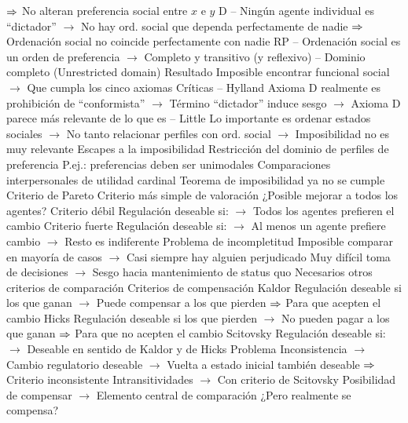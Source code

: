 \documentclass{nuevotema}
\begin{document}
\begin{esquemal}
				\4[] $\Rightarrow$ No alteran preferencia social entre $x$ e $y$
				\4[] D -- Ningún agente individual es ``dictador''
				\4[] $\to$ No hay ord. social que dependa perfectamente de nadie
				\4[] $\Rightarrow$ Ordenación social no coincide perfectamente con nadie
				\4[] RP -- Ordenación social es un orden de preferencia
				\4[] $\to$ Completo y transitivo (y reflexivo)
				\4[U] -- Dominio completo (Unrestricted domain)
				\4 Resultado
				\4[] Imposible encontrar funcional social
				\4[] $\to$ Que cumpla los cinco axiomas
				\4 Críticas
				\4[] -- Hylland
				\4[] Axioma D realmente es prohibición de ``conformista''
				\4[] $\to$ Término ``dictador'' induce sesgo
				\4[] $\to$ Axioma D parece más relevante de lo que es
				\4[] -- Little
				\4[] Lo importante es ordenar estados sociales
				\4[] $\to$ No tanto relacionar perfiles con ord. social
				\4[] $\to$ Imposibilidad no es muy relevante
			\3 Escapes a la imposibilidad
				\4 Restricción del dominio de perfiles de preferencia
				\4[] P.ej.: preferencias deben ser unimodales
				\4 Comparaciones interpersonales de utilidad cardinal
				\4[] Teorema de imposibilidad ya no se cumple
			\3 Criterio de Pareto
				\4 Criterio más simple de valoración
				\4[] ¿Posible mejorar a todos los agentes?
				\4 Criterio débil
				\4[] Regulación deseable si:
				\4[] $\to$ Todos los agentes prefieren el cambio
				\4 Criterio fuerte
				\4[] Regulación deseable si:
				\4[] $\to$ Al menos un agente prefiere cambio
				\4[] $\to$ Resto es indiferente
				\4 Problema de incompletitud
				\4[] Imposible comparar en mayoría de casos
				\4[] $\to$ Casi siempre hay alguien perjudicado
				\4[] Muy difícil toma de decisiones
				\4[] $\to$ Sesgo hacia mantenimiento de status quo
				\4[] Necesarios otros criterios de comparación
			\3 Criterios de compensación
				\4 Kaldor
				\4[] Regulación deseable si los que ganan
				\4[] $\to$ Puede compensar a los que pierden
				\4[] $\Rightarrow$ Para que acepten el cambio
				\4 Hicks
				\4[] Regulación deseable si los que pierden
				\4[] $\to$ No pueden pagar a los que ganan
				\4[] $\Rightarrow$ Para que no acepten el cambio
				\4 Scitovsky
				\4[] Regulación deseable si:
				\4[] $\to$ Deseable en sentido de Kaldor y de Hicks
				\4 Problema
				\4[] Inconsistencia
				\4[] $\to$ Cambio regulatorio deseable
				\4[] $\to$ Vuelta a estado inicial también deseable
				\4[] $\Rightarrow$ Criterio inconsistente
				\4[] Intransitividades
				\4[] $\to$ Con criterio de Scitovsky
				\4[] Posibilidad de compensar
				\4[] $\to$ Elemento central de comparación
				\4[] ¿Pero realmente se compensa?

\end{esquemal}
\end{document}
